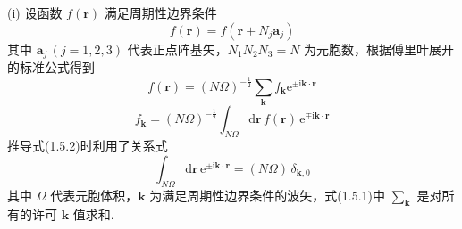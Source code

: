 (i) 设函数 $f(\boldsymbol{r})$ 满足周期性边界条件
\begin{equation*}
  f(\boldsymbol{r})=f(\boldsymbol{r}+N_j\boldsymbol{a}_j)
\end{equation*}
其中 $\boldsymbol{a}_j\,(j=1,2,3)$ 代表正点阵基矢，$N_1N_2N_3=N$ 为元胞数，根据傅里叶展开的标准公式得到
\begin{equation}
  f(\boldsymbol{r})=(N\Omega)^{-\frac{1}{2}}\sum_{\boldsymbol{k}}f_{\boldsymbol{k}}
  \mathrm{e}^{\pm\mathrm{i}\boldsymbol{k}\cdot\boldsymbol{r}}
\end{equation}
\begin{equation}
  f_{\boldsymbol{k}}=(N\Omega)^{-\frac{1}{2}}\int_{N\Omega}\mathrm{d}\boldsymbol{r}\,
  f(\boldsymbol{r})\,\mathrm{e}^{\mp\mathrm{i}\boldsymbol{k}\cdot\boldsymbol{r}}
\end{equation}
推导式(1.5.2)时利用了关系式
\begin{equation}
  \int_{N\Omega}\mathrm{d}\boldsymbol{r}\,\mathrm{e}^{\pm\mathrm{i}\boldsymbol{k}\cdot\boldsymbol{r}}
  =(N\Omega)\,\delta_{\boldsymbol{k},0}
\end{equation}
其中 $\Omega$ 代表元胞体积，$\boldsymbol{k}$ 为满足周期性边界条件的波矢，式(1.5.1)中 $\sum_{\boldsymbol{k}}$ 是对所有的许可 $\boldsymbol{k}$ 值求和.

